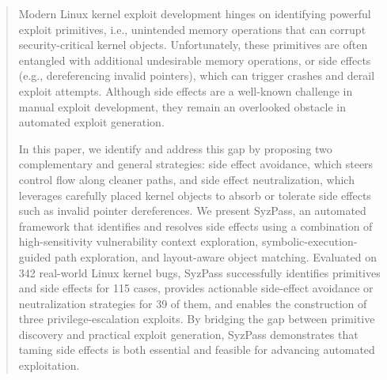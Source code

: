 \documentclass[conference]{IEEEtran}
\newcommand{\cut}[1]{}
\begin{document}
\begin{abstract}
Modern Linux kernel exploit development hinges on identifying powerful exploit primitives, i.e., unintended memory operations that can corrupt security-critical kernel objects. Unfortunately, these primitives are often entangled with additional undesirable memory operations, or side effects (e.g., dereferencing invalid pointers), which can trigger crashes and derail exploit attempts. Although side effects are a well-known challenge in manual exploit development, they remain an overlooked obstacle in automated exploit generation.

In this paper, we identify and address this gap by proposing two complementary and general strategies: side effect avoidance, which steers control flow along cleaner paths, and side effect neutralization, which leverages carefully placed kernel objects to absorb or tolerate side effects such as invalid pointer dereferences.
We present SyzPass, an automated framework that identifies and resolves side effects using a combination of high-sensitivity vulnerability context exploration, symbolic-execution-guided path exploration, and layout-aware object matching. Evaluated on 342 real-world Linux kernel bugs, SyzPass successfully identifies primitives and side effects for 115 cases, provides actionable side-effect avoidance or neutralization strategies for 39 of them, and enables the construction of three privilege-escalation exploits. By bridging the gap between primitive discovery and practical exploit generation, SyzPass demonstrates that taming side effects is both essential and feasible for advancing automated exploitation.



\cut{
Modern Linux kernel exploit development hinges on finding powerful \emph{primitives}—unintended memory operations that an attacker can steer toward security-critical objects.  Unfortunately, these primitives are often entangled with additional unintended operations, we refer to \emph{side effects}, that corrupt unrelated data or dereference invalid pointers, crashing the kernel and derailing an exploit. We \emph{identify} this overlooked obstacle and propose two complementary, generic solutions: \emph{side effects avoidance}, which steers control flow onto cleaner paths, and \emph{side effects neutralization}, which pairs pointer dereferences with sprayable kernel objects.

Furthermore, we present \textbf{SyzPass}, an automated framework that discovers memory effects within vulnerabilities and performs high sensitivity vulnerability context exploration, symbolic execution guided path exploration and layout-aware object matching to resolve side effects based on the two strategies for them. Evaluated on \mbox{115} real-world bugs, SyzPass can purify primitives in \mbox{39} cases and enables the construction of \mbox{three} privilege-escalation exploits. By bridging the gap between primitive discovery and practical exploit generation, SyzPass demonstrates that taming side effects is both essential and feasible.
}



\end{abstract}
\end{document}
